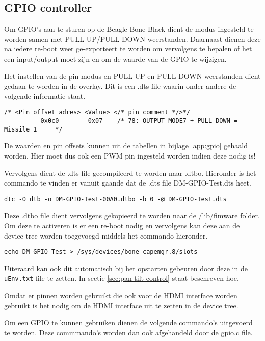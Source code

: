 \subsection{GPIO controller}
\label{sec:gpio}

Om GPIO's aan te sturen op de Beagle Bone Black dient de modus ingesteld te worden
samen met PULL-UP/PULL-DOWN weerstanden. Daarnaast dienen deze na iedere re-boot
weer ge-exporteert te worden om vervolgens te bepalen of het een input/output moet
zijn en om de waarde van de GPIO te wijzigen.

Het instellen van de pin modus en PULL-UP en PULL-DOWN weerstanden dient gedaan te
worden in de overlay. Dit is een .dts file waarin onder andere de volgende informatie
staat.

\begin{verbatim}
/* <Pin offset adres> <Value> </* pin comment */>*/
          0x0c0        0x07    /* 78: OUTPUT MODE7 + PULL-DOWN = Missile 1     */
\end{verbatim}

De waarden en pin offsets kunnen uit de tabellen in bijlage \ref{app:gpio} gehaald worden. Hier
moet dus ook een PWM pin ingesteld worden indien deze nodig is!

Vervolgens dient de .dts file gecompileerd te worden naar .dtbo. Hieronder is het
commando te vinden er vanuit gaande dat de .dts file DM-GPIO-Test.dts heet.

\begin{verbatim}
dtc -O dtb -o DM-GPIO-Test-00A0.dtbo -b 0 -@ DM-GPIO-Test.dts
\end{verbatim}

Deze .dtbo file dient vervolgens gekopieerd te worden naar de /lib/fimware folder.
Om deze te activeren is er een re-boot nodig en vervolgens kan deze aan de device
tree worden toegevoegd middels het commando hieronder.

\begin{verbatim}
echo DM-GPIO-Test > /sys/devices/bone_capemgr.8/slots
\end{verbatim}

Uiteraard kan ook dit automatisch bij het opstarten gebeuren door deze in de
\texttt{uEnv.txt} file te zetten. In sectie \ref{sec:pan-tilt-control} staat
beschreven hoe.

Omdat er pinnen worden gebruikt die ook voor de HDMI interface worden gebruikt
is het nodig om de HDMI interface uit te zetten in de device tree.

Om een GPIO te kunnen gebruiken dienen de volgende commando's uitgevoerd te worden.
Deze commmando's worden dan ook afgehandeld door de gpio.c file.

